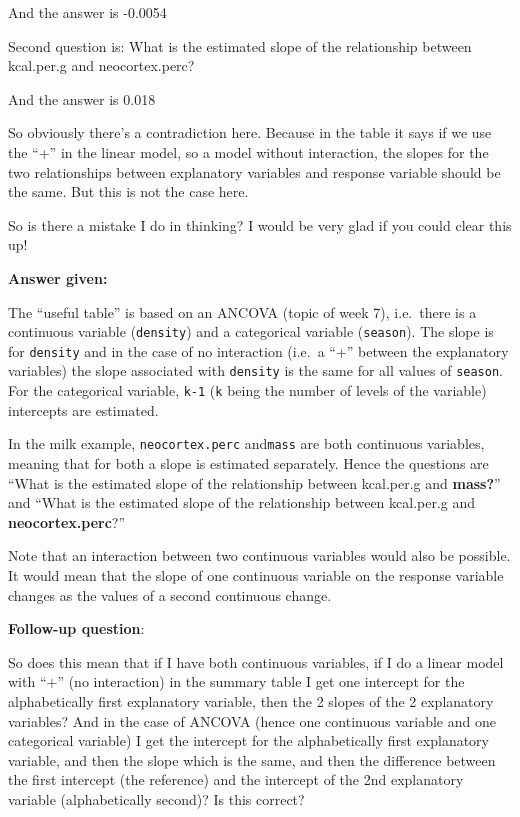 \documentclass[
  letterpaper,
  8pt,
  a4paper]{book}
\begin{document}
And the answer is -0.0054

Second question is: What is the estimated slope of the relationship
between kcal.per.g and neocortex.perc?

And the answer is 0.018

So obviously there's a contradiction here. Because in the table it says
if we use the ``+'' in the linear model, so a model without interaction,
the slopes for the two relationships between explanatory variables and
response variable should be the same. But this is not the case here.

So is there a mistake I do in thinking? I would be very glad if you
could clear this up!

\textbf{Answer given:}

The ``useful table'' is based on an ANCOVA (topic of week 7), i.e.~there
is a continuous variable (\texttt{density}) and a categorical variable
(\texttt{season}). The slope is for \texttt{density} and in the case of
no interaction (i.e.~a ``+'' between the explanatory variables) the
slope associated with \texttt{density} is the same for all values of
\texttt{season}. For the categorical variable, \texttt{k-1} (\texttt{k}
being the number of levels of the variable) intercepts are estimated.

In the milk example, \texttt{neocortex.perc} and\texttt{mass} are both
continuous variables, meaning that for both a slope is estimated
separately. Hence the questions are ``What is the estimated slope of the
relationship between kcal.per.g and \textbf{mass?}'' and ``What is the
estimated slope of the relationship between kcal.per.g and
\textbf{neocortex.perc}?''

Note that an interaction between two continuous variables would also be
possible. It would mean that the slope of one continuous variable on the
response variable changes as the values of a second continuous change.

\textbf{Follow-up question}:

So does this mean that if I have both continuous variables, if I do a
linear model with ``+'' (no interaction) in the summary table I get one
intercept for the alphabetically first explanatory variable, then the 2
slopes of the 2 explanatory variables? And in the case of ANCOVA (hence
one continuous variable and one categorical variable) I get the
intercept for the alphabetically first explanatory variable, and then
the slope which is the same, and then the difference between the first
intercept (the reference) and the intercept of the 2nd explanatory
variable (alphabetically second)? Is this correct?
\end{document}
